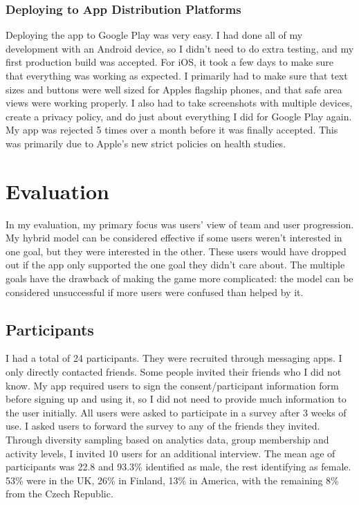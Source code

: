 \documentclass{l4proj}
\begin{document}
\subsection{Deploying to App Distribution Platforms}
Deploying the app to Google Play was very easy. I had done all of my development with an Android device, so I didn't need to do extra testing, and my first production build was accepted. For iOS, it took a few days to make sure that everything was working as expected. I primarily had to make sure that text sizes and buttons were well sized for Apples flagship phones, and that safe area views were working properly. I also had to take screenshots with multiple devices, create a privacy policy, and do just about everything I did for Google Play again. My app was rejected 5 times over a month before it was finally accepted. This was primarily due to Apple's new strict policies on health studies.

\chapter{Evaluation}
In my evaluation, my primary focus was users' view of team and user progression. My hybrid model can be considered effective if some users weren't interested in one goal, but they were interested in the other. These users would have dropped out if the app only supported the one goal they didn't care about. The multiple goals have the drawback of making the game more complicated: the model can be considered unsuccessful if more users were confused than helped by it. 

\section{Participants}
I had a total of 24 participants. They were recruited through messaging apps. I only directly contacted friends. Some people invited their friends who I did not know. My app required users to sign the consent/participant information form before signing up and using it, so I did not need to provide much information to the user initially. All users were asked to participate in a survey after 3 weeks of use. I asked users to forward the survey to any of the friends they invited. Through diversity sampling based on analytics data, group membership and activity levels, I invited 10 users for an additional interview. The mean age of participants was 22.8 and 93.3\% identified as male, the rest identifying as female. 53\% were in the UK, 26\% in Finland, 13\% in America, with the remaining 8\% from the Czech Republic. 
\end{document}
